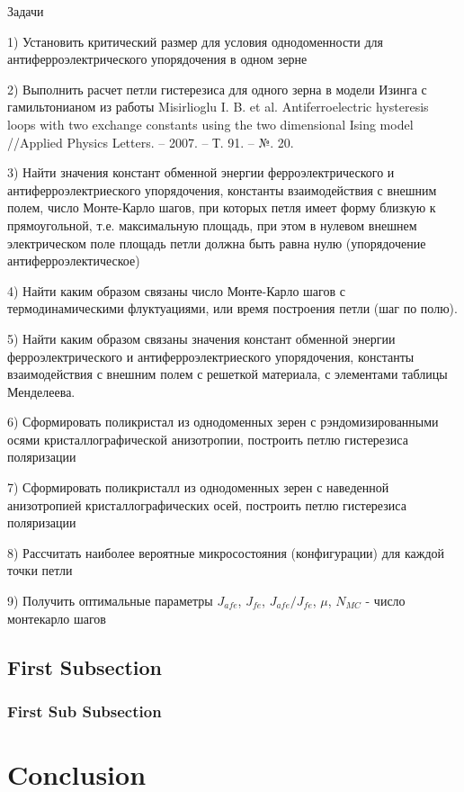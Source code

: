 \documentclass{WileyMSP-template}
\begin{document}
Задачи

1) Установить критический размер для условия однодоменности для антиферроэлектрического упорядочения в одном зерне

2) Выполнить расчет петли гистерезиса для одного зерна в модели Изинга с гамильтонианом из работы 
Misirlioglu I. B. et al. Antiferroelectric hysteresis loops with two exchange constants using the two dimensional Ising model //Applied Physics Letters. – 2007. – Т. 91. – №. 20.

3) Найти значения констант обменной энергии ферроэлектрического и антиферроэлектриеского упорядочения, константы взаимодействия с внешним полем, число Монте-Карло шагов, при которых петля имеет форму близкую к прямоугольной, т.е. максимальную площадь, при этом в нулевом внешнем электрическом поле площадь петли должна быть равна нулю (упорядочение антиферроэлектическое) 

4) Найти каким образом связаны число Монте-Карло шагов с термодинамическими флуктуациями, или время построения петли (шаг по полю).

5) Найти каким образом связаны значения констант обменной энергии ферроэлектрического и антиферроэлектриеского упорядочения, константы взаимодействия с внешним полем с решеткой материала, с элементами таблицы Менделеева.  

6) Сформировать поликристал из однодоменных зерен с рэндомизированными осями кристаллографической анизотропии, построить петлю гистерезиса поляризации

7) Сформировать поликристалл из однодоменных зерен с наведенной анизотропией кристаллографических осей, построить петлю гистерезиса поляризации  

8) Рассчитать наиболее вероятные микросостояния (конфигурации) для каждой точки петли

9) Получить оптимальные параметры $J_{afe}$, $J_{fe}$, $J_{afe}/J_{fe}$, $\mu$, $ N_{MC}$ - число монтекарло шагов 

\subsection{First Subsection}


\subsubsection{First Sub Subsection}




\section{Conclusion}
\end{document}
